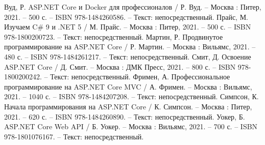 \begin{thebibliography}{9}
     Вуд, Р. ASP.NET Core и Docker для профессионалов / Р. Вуд. – Москва : Питер, 2021. – 500 с. – ISBN 978-1484260586. – Текст: непосредственный.
     Прайс, М. Изучаем C\# 9 и .NET 5 / М. Прайс. – Москва : Питер, 2021. – 500 с. – ISBN 978-1800200723. – Текст: непосредственный.
     Мартин, Р. Продвинутое программирование на ASP.NET Core / Р. Мартин. – Москва : Вильямс, 2021. – 480 с. – ISBN 978-1484261217. – Текст: непосредственный.
     Смит, Д. Освоение ASP.NET Core / Д. Смит. – Москва : ДМК Пресс, 2021. – 800 с. – ISBN 978-1800200242. – Текст: непосредственный.
     Фримен, А. Профессиональное программирование на ASP.NET Core MVC / А. Фримен. – Москва : Вильямс, 2021. – 1040 с. – ISBN 978-1484207208. – Текст: непосредственный.
     Симпсон, К. Начала программирования на ASP.NET Core / К. Симпсон. – Москва : Питер, 2021. – 620 с. – ISBN 978-1484260890. – Текст: непосредственный.
     Уокер, Б. ASP.NET Core Web API / Б. Уокер. – Москва : Вильямс, 2021. – 700 с. – ISBN 978-1801076167. – Текст: непосредственный.
\end{thebibliography}
